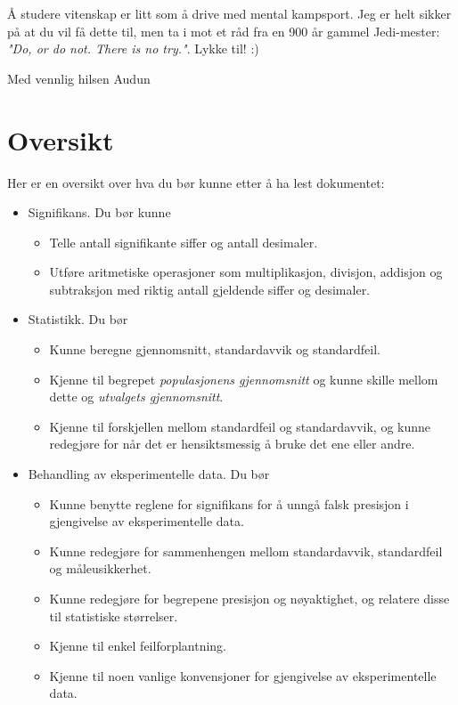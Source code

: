 \documentclass[a4paper,9pt]{article}
\begin{document}
\vspace{.5cm}

Å studere vitenskap er litt som å drive med mental kampsport. Jeg er helt sikker på at du vil få dette til, men ta i mot et råd fra en 900 år gammel Jedi-mester: \emph{"Do, or do not. There is no try."}. Lykke til! :)

\vspace{.5cm}

\begin{flushright}
Med vennlig hilsen Audun
\end{flushright}




\pagebreak

\section{Oversikt}

Her er en oversikt over hva du bør kunne etter å ha lest dokumentet:

\begin{itemize}
\item Signifikans. Du bør kunne
\begin{itemize}
\item Telle antall signifikante siffer og antall desimaler.
\item Utføre aritmetiske operasjoner som multiplikasjon, divisjon, addisjon og subtraksjon med riktig antall gjeldende siffer og desimaler.
\end{itemize}
\item Statistikk. Du bør
\begin{itemize}
\item Kunne beregne gjennomsnitt, standardavvik og standardfeil.
\item Kjenne til begrepet \emph{populasjonens gjennomsnitt} og kunne skille mellom dette og \emph{utvalgets gjennomsnitt}.
\item Kjenne til forskjellen mellom standardfeil og standardavvik, og kunne redegjøre for når det er hensiktsmessig å bruke det ene eller andre.
\end{itemize}
\item Behandling av eksperimentelle data. Du bør
\begin{itemize}
\item Kunne benytte reglene for signifikans for å unngå falsk presisjon i gjengivelse av eksperimentelle data.
\item Kunne redegjøre for sammenhengen mellom standardavvik, standardfeil og måleusikkerhet.
\item Kunne redegjøre for begrepene presisjon og nøyaktighet, og relatere disse til statistiske størrelser.
\item Kjenne til enkel feilforplantning.
\item Kjenne til noen vanlige konvensjoner for gjengivelse av eksperimentelle data.
\end{itemize}
\end{itemize}
\end{document}
